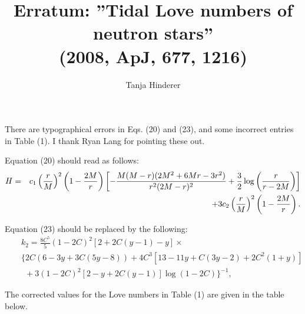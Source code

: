 \documentclass[12pt,preprint]{aastex}
\begin{document}
\title{Erratum: ''Tidal Love numbers of neutron stars''\\
(2008, ApJ, 677, 1216) }


\author{Tanja Hinderer}
 


There are typographical errors in Eqs. (20) and (23), and some
incorrect entries in Table (1). I thank Ryan Lang for pointing these
out.


Equation (20) should read as follows:
\begin{eqnarray}
H&=&c_1 \left({r \over M}\right)^2\left(1-{2M \over r} \right)
\left[ -{M(M-r)(2M^2+6Mr-3r^2)\over r^2(2M-r)^2} + {3 \over 2}
\log{\left({r \over r-2M}\right)} \right]\nonumber\\
&&+  3 c_2  \left({r \over M}\right)^2\left(1-{2M \over r} \right).
\nonumber\end{eqnarray}



Equation (23) should be replaced by the following:
 \begin{eqnarray}
&& k_2 = \frac{8C^5}{5}\left(1-2C\right)^2
\left[2+2C\left(y-1\right)-y\right]\times\nonumber\\
&&\bigg\{2C\left(6-3 y+3 C(5y-8)\right)+4C^3\left[13-11y+C(3 y-2)+2
C^2(1+y)\right] \nonumber\\
&& ~ ~
+3(1-2C)^2\left[2-y+2C(y-1)\right]\log\left(1-2C\right)\bigg\}^{-1},\nonumber
\end{eqnarray}

The corrected values for the Love numbers in Table (1) are given in
the table below.


 \clearpage
\end{document}
